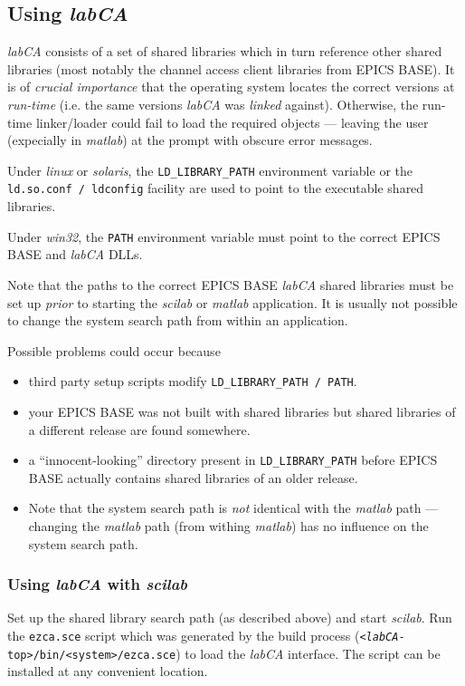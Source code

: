 \documentclass{article}
\newcommand{\sca}{{\em labCA}}
\newcommand{\scilab}{{\em scilab}}
\newcommand{\matlab}{{\em matlab}}
\newcommand{\windoze}{{\em win32}}
\begin{document}
\subsection{Using \sca{}}
\sca{} consists of a set of shared libraries which in turn reference
other shared libraries (most notably the channel access client libraries
from EPICS BASE). It is of {\em crucial importance} that the operating
system locates the correct versions at {\em run-time} (i.e. the same versions
\sca{} was {\em linked} against). Otherwise, the run-time linker/loader
could fail to load the required objects --- leaving the user (expecially
in \matlab) at the prompt with obscure error messages.

Under {\em linux} or {\em solaris}, the {\tt LD\_LIBRARY\_PATH} environment
variable or the {\tt ld.so.conf / ldconfig} facility are used to point
to the executable shared libraries.

Under \windoze{}, the {\tt PATH} environment variable must point to the
correct EPICS BASE and \sca{} DLLs.

Note that the paths to the correct EPICS BASE \sca{} shared libraries
must be set up {\em prior} to starting the \scilab{} or \matlab{} application.
It is usually not possible to change the system search
path from within an application.

Possible problems could occur because
\begin{itemize}
\item third party setup scripts modify {\tt LD\_LIBRARY\_PATH / PATH}.
\item your EPICS BASE was not built with shared libraries but shared libraries
of a different release are found somewhere.
\item a ``innocent-looking'' directory present in {\tt LD\_LIBRARY\_PATH}
before EPICS BASE actually contains shared libraries of an older release.
\item Note that the system search path is {\em not} identical with the
\matlab{} path --- changing the \matlab{} path (from withing \matlab)
has no influence on the system search path.
\end{itemize}

\subsubsection{Using \sca{} with \scilab}
Set up the shared library search path (as described above) and start
\scilab. Run the {\tt ezca.sce} script which was generated by the build process
({\tt <\sca-top>/bin/<system>/ezca.sce}) to load the \sca{} interface.
The script can be installed at any convenient location.
\end{document}
